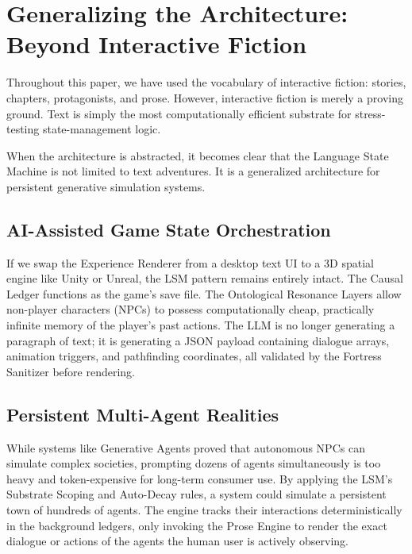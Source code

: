 \documentclass[12pt, a4paper]{article}
\begin{document}
\newpage
\section{Generalizing the Architecture: Beyond Interactive Fiction}
\label{sec:generalize}

Throughout this paper, we have used the vocabulary of interactive fiction: stories, chapters, protagonists, and prose. However, interactive fiction is merely a proving ground. Text is simply the most computationally efficient substrate for stress-testing state-management logic. 

When the architecture is abstracted, it becomes clear that the Language State Machine is not limited to text adventures. It is a generalized architecture for persistent generative simulation systems.

\subsection{AI-Assisted Game State Orchestration}

If we swap the Experience Renderer from a desktop text UI to a 3D spatial engine like Unity or Unreal, the LSM pattern remains entirely intact. The Causal Ledger functions as the game's save file. The Ontological Resonance Layers allow non-player characters (NPCs) to possess computationally cheap, practically infinite memory of the player's past actions. The LLM is no longer generating a paragraph of text; it is generating a JSON payload containing dialogue arrays, animation triggers, and pathfinding coordinates, all validated by the Fortress Sanitizer before rendering.

\subsection{Persistent Multi-Agent Realities}
While systems like Generative Agents \citep{park2023agents} proved that autonomous NPCs can simulate complex societies, prompting dozens of agents simultaneously is too heavy and token-expensive for long-term consumer use. By applying the LSM's Substrate Scoping and Auto-Decay rules, a system could simulate a persistent town of hundreds of agents. The engine tracks their interactions deterministically in the background ledgers, only invoking the Prose Engine to render the exact dialogue or actions of the agents the human user is actively observing. 
\end{document}
